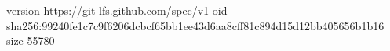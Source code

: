 version https://git-lfs.github.com/spec/v1
oid sha256:99240fe1c7c9f6206dcbcf65bb1ee43d6aa8cff81c894d15d12bb405656b1b16
size 55780
